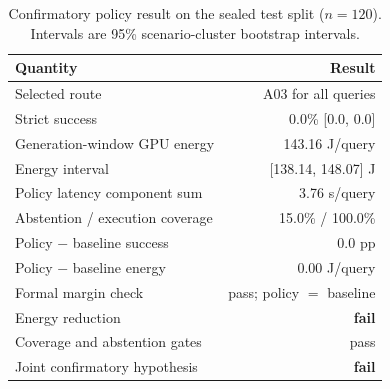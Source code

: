 \begin{table}[t]
\caption{Confirmatory policy result on the sealed test split ($n=120$). Intervals are 95\% scenario-cluster bootstrap intervals.}
\label{tab:confirmatory}
\centering
\small
\begin{tabular}{@{}lr@{}}
\toprule
Quantity & Result \\
\midrule
Selected route & A03 for all queries \\
Strict success & 0.0\% [0.0, 0.0] \\
Generation-window GPU energy & 143.16 J/query \\
Energy interval & [138.14, 148.07] J \\
Policy latency component sum & 3.76 s/query \\
Abstention / execution coverage & 15.0\% / 100.0\% \\
Policy $-$ baseline success & 0.0 pp \\
Policy $-$ baseline energy & 0.00 J/query \\
\midrule
Formal margin check & pass; policy $=$ baseline \\
Energy reduction & \textbf{fail} \\
Coverage and abstention gates & pass \\
Joint confirmatory hypothesis & \textbf{fail} \\
\bottomrule
\end{tabular}
\end{table}
